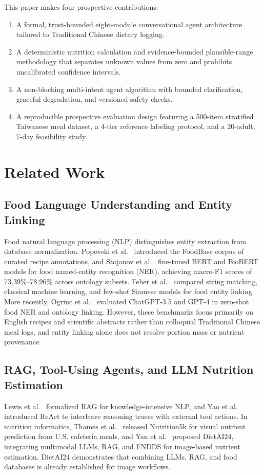 \documentclass[conference]{IEEEtran}
\begin{document}
This paper makes four prospective contributions:
\begin{enumerate}
    \item A formal, trust-bounded eight-module conversational agent architecture tailored to Traditional Chinese dietary logging.
    \item A deterministic nutrition calculation and evidence-bounded plausible-range methodology that separates unknown values from zero and prohibits uncalibrated confidence intervals.
    \item A non-blocking multi-intent agent algorithm with bounded clarification, graceful degradation, and versioned safety checks.
    \item A reproducible prospective evaluation design featuring a 500-item stratified Taiwanese meal dataset, a 4-tier reference labeling protocol, and a 20-adult, 7-day feasibility study.
\end{enumerate}

\section{Related Work}
\subsection{Food Language Understanding and Entity Linking}
Food natural language processing (NLP) distinguishes entity extraction from database normalization. Popovski et al.~\cite{popovski2019foodbase} introduced the FoodBase corpus of curated recipe annotations, and Stojanov et al.~\cite{stojanov2021foodner} fine-tuned BERT and BioBERT models for food named-entity recognition (NER), achieving macro-F1 scores of 73.39\%--78.96\% across ontology subsets. Feher et al.~\cite{feher2023fewshot} compared string matching, classical machine learning, and few-shot Siamese models for food entity linking. More recently, Ogrinc et al.~\cite{ogrinc2024zeroshot} evaluated ChatGPT-3.5 and GPT-4 in zero-shot food NER and ontology linking. However, these benchmarks focus primarily on English recipes and scientific abstracts rather than colloquial Traditional Chinese meal logs, and entity linking alone does not resolve portion mass or nutrient provenance.

\subsection{RAG, Tool-Using Agents, and LLM Nutrition Estimation}
Lewis et al.~\cite{lewis2020rag} formalized RAG for knowledge-intensive NLP, and Yao et al.~\cite{yao2023react} introduced ReAct to interleave reasoning traces with external tool actions. In nutrition informatics, Thames et al.~\cite{thames2021nutrition5k} released Nutrition5k for visual nutrient prediction from U.S. cafeteria meals, and Yan et al.~\cite{yan2025dietai24} proposed DietAI24, integrating multimodal LLMs, RAG, and FNDDS for image-based nutrient estimation. DietAI24 demonstrates that combining LLMs, RAG, and food databases is already established for image workflows.
\end{document}
